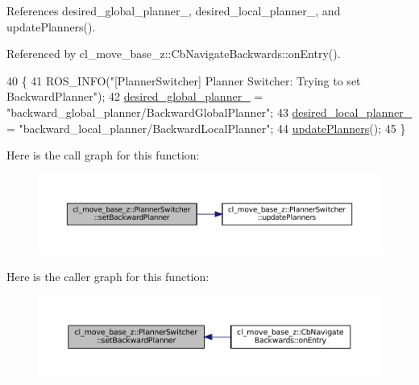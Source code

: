 References desired\+\_\+global\+\_\+planner\+\_\+, desired\+\_\+local\+\_\+planner\+\_\+, and update\+Planners().



Referenced by cl\+\_\+move\+\_\+base\+\_\+z\+::\+Cb\+Navigate\+Backwards\+::on\+Entry().


\begin{DoxyCode}
40 \{
41   ROS\_INFO(\textcolor{stringliteral}{"[PlannerSwitcher] Planner Switcher: Trying to set BackwardPlanner"});
42   \hyperlink{classcl__move__base__z_1_1PlannerSwitcher_aef047d3778b2993c1df146bbad43e03d}{desired\_global\_planner\_} = \textcolor{stringliteral}{"backward\_global\_planner/BackwardGlobalPlanner"};
43   \hyperlink{classcl__move__base__z_1_1PlannerSwitcher_a6cbf65f11bb69125f913caaabdf7b4cf}{desired\_local\_planner\_} = \textcolor{stringliteral}{"backward\_local\_planner/BackwardLocalPlanner"};
44   \hyperlink{classcl__move__base__z_1_1PlannerSwitcher_a146641f63aea3185daab4c5cbb789550}{updatePlanners}();
45 \}
\end{DoxyCode}
Here is the call graph for this function\+:
\nopagebreak
\begin{figure}[H]
\begin{center}
\leavevmode
\includegraphics[width=350pt]{classcl__move__base__z_1_1PlannerSwitcher_a6995deff44418a0965e4e793de8c4857_cgraph}
\end{center}
\end{figure}
Here is the caller graph for this function\+:
\nopagebreak
\begin{figure}[H]
\begin{center}
\leavevmode
\includegraphics[width=350pt]{classcl__move__base__z_1_1PlannerSwitcher_a6995deff44418a0965e4e793de8c4857_icgraph}
\end{center}
\end{figure}
\mbox{\label{classcl__move__base__z_1_1PlannerSwitcher_ad3f0d08a51af6218d203bf44a7f9df40}} 
